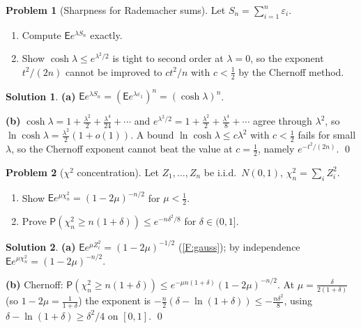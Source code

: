 \documentclass[12pt,a4paper]{article}
\theoremstyle{definition}
\newtheorem{exercise}{Problem}
\newtheorem*{solution*}{Solution}
\newcommand\expc{\mathsf{E}}
\newcommand\prb{\mathsf{P}}
\begin{document}
\begin{exercise}[Sharpness for Rademacher sums]\label{prob:sharp}
Let $S_n=\sum_{i=1}^n\varepsilon_i$.
\begin{enumerate}[label=(\alph*)]
\item Compute $\expc e^{\lambda S_n}$ exactly.
\item Show $\cosh\lambda\le e^{\lambda^2/2}$ is tight to second order at $\lambda=0$, so the exponent $t^2/(2n)$ cannot be improved to $ct^2/n$ with $c<\tfrac12$ by the Chernoff method.
\end{enumerate}
\end{exercise}
\begin{solution*}
\textbf{(a)} $\expc e^{\lambda S_n}=(\expc e^{\lambda\varepsilon_1})^n=(\cosh\lambda)^n$.

\textbf{(b)} $\cosh\lambda=1+\tfrac{\lambda^2}2+\tfrac{\lambda^4}{24}+\cdots$ and $e^{\lambda^2/2}=1+\tfrac{\lambda^2}2+\tfrac{\lambda^4}8+\cdots$ agree through $\lambda^2$, so $\ln\cosh\lambda=\tfrac{\lambda^2}2(1+o(1))$. A bound $\ln\cosh\lambda\le c\lambda^2$ with $c<\tfrac12$ fails for small $\lambda$, so the Chernoff exponent cannot beat the value at $c=\tfrac12$, namely $e^{-t^2/(2n)}$. \qed
\end{solution*}

\begin{exercise}[$\chi^2$ concentration]\label{prob:chisq}
Let $Z_1,\ldots,Z_n$ be i.i.d.\ $N(0,1)$, $\chi^2_n=\sum_iZ_i^2$.
\begin{enumerate}[label=(\alph*)]
\item Show $\expc e^{\mu\chi^2_n}=(1-2\mu)^{-n/2}$ for $\mu<\tfrac12$.
\item Prove $\prb(\chi^2_n\ge n(1+\delta))\le e^{-n\delta^2/8}$ for $\delta\in(0,1]$.
\end{enumerate}
\end{exercise}
\begin{solution*}
\textbf{(a)} $\expc e^{\mu Z_i^2}=(1-2\mu)^{-1/2}$ (\ref{F:gauss}); by independence $\expc e^{\mu\chi^2_n}=(1-2\mu)^{-n/2}$.

\textbf{(b)} Chernoff: $\prb(\chi^2_n\ge n(1+\delta))\le e^{-\mu n(1+\delta)}(1-2\mu)^{-n/2}$. At $\mu=\tfrac{\delta}{2(1+\delta)}$ (so $1-2\mu=\tfrac1{1+\delta}$) the exponent is $-\tfrac n2(\delta-\ln(1+\delta))\le-\tfrac{n\delta^2}8$, using $\delta-\ln(1+\delta)\ge\delta^2/4$ on $[0,1]$. \qed
\end{solution*}
\end{document}
